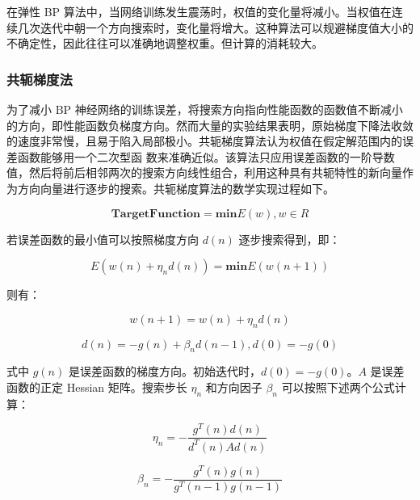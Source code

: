 \documentclass[UTF8]{ctexart}
\begin{document}
在弹性 BP 算法中，当网络训练发生震荡时，权值的变化量将减小。当权值在连续几次迭代中朝一个方向搜索时，变化量将增大。这种算法可以规避梯度值大小的不确定性，因此往往可以准确地调整权重。但计算的消耗较大。

\subsubsection{共轭梯度法}

为了减小 BP 神经网络的训练误差，将搜索方向指向性能函数的函数值不断减小的方向，即性能函数负梯度方向。然而大量的实验结果表明，原始梯度下降法收敛的速度非常慢，且易于陷入局部极小。共轭梯度算法认为权值在假定解范围内的误差函数能够用一个二次型函
数来准确近似。该算法只应用误差函数的一阶导数值，然后将前后相邻两次的搜索方向线性组合，利用这种具有共轭特性的新向量作为方向向量进行逐步的搜索。共轭梯度算法的数学实现过程如下。 \par

\begin{equation}
\mathbf{Target Function} = \mathbf{min} E(w), w \in R
\end {equation}

若误差函数的最小值可以按照梯度方向 $d(n)$ 逐步搜索得到，即： \par

\begin{equation}
E(w(n) + \eta_{n}d(n)) = \mathbf{min} E(w(n+1))
\end {equation}

则有： \par

\begin{equation}
w(n+1) = w(n) + \eta_{n}d(n)
\end {equation}

\begin{equation}
d(n) = -g(n) + \beta_n d(n-1), d(0) = -g(0)
\end {equation}

式中 $g(n)$ 是误差函数的梯度方向。初始迭代时，$d(0)=-g(0)$。$A$ 是误差函数的正定 Hessian 矩阵。搜索步长 $\eta_n$ 和方向因子 $\beta_n$ 可以按照下述两个公式计算： \par

\begin{equation}
\eta_{n} = - \frac{g^{T}(n) d(n)}{d^{T}(n) Ad(n)}
\end {equation}

\begin{equation}
\beta_{n} = - \frac{g^{T}(n) g(n)}{g^{T}(n-1) g(n-1)}
\end {equation}
\end{document}
